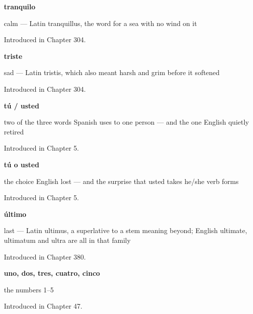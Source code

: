\noindent\begin{minipage}[t]{\linewidth}
\raggedright
\textbf{tranquilo}\par
\small calm — Latin tranquillus, the word for a sea with no wind on it\par
\footnotesize Introduced in Chapter 304.
\end{minipage}\par\medskip

\noindent\begin{minipage}[t]{\linewidth}
\raggedright
\textbf{triste}\par
\small sad — Latin tristis, which also meant harsh and grim before it softened\par
\footnotesize Introduced in Chapter 304.
\end{minipage}\par\medskip

\noindent\begin{minipage}[t]{\linewidth}
\raggedright
\textbf{tú / usted}\par
\small two of the three words Spanish uses to one person — and the one English quietly retired\par
\footnotesize Introduced in Chapter 5.
\end{minipage}\par\medskip

\noindent\begin{minipage}[t]{\linewidth}
\raggedright
\textbf{tú o usted}\par
\small the choice English lost — and the surprise that usted takes he/she verb forms\par
\footnotesize Introduced in Chapter 5.
\end{minipage}\par\medskip

\noindent\begin{minipage}[t]{\linewidth}
\raggedright
\textbf{último}\par
\small last — Latin ultimus, a superlative to a stem meaning beyond; English ultimate, ultimatum and ultra are all in that family\par
\footnotesize Introduced in Chapter 380.
\end{minipage}\par\medskip

\noindent\begin{minipage}[t]{\linewidth}
\raggedright
\textbf{uno, dos, tres, cuatro, cinco}\par
\small the numbers 1–5\par
\footnotesize Introduced in Chapter 47.
\end{minipage}\par\medskip

